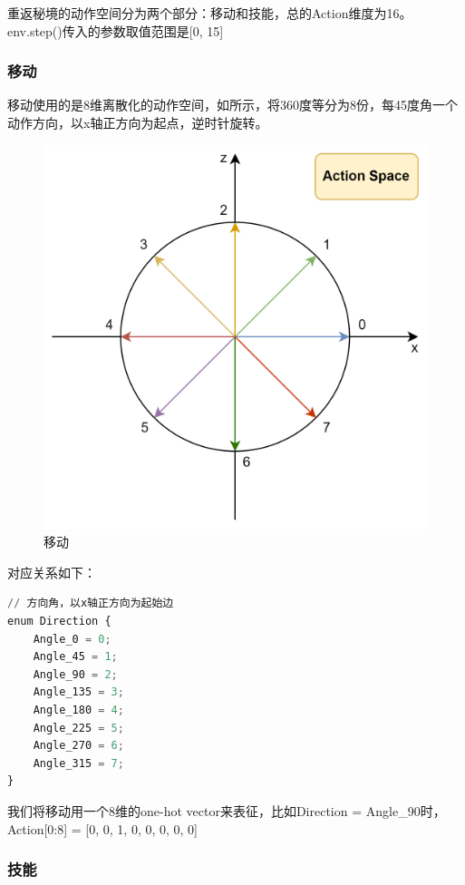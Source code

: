 重返秘境的动作空间分为两个部分：移动和技能，总的Action维度为16。env.step()传入的参数取值范围是[0, 15]


\subsubsection{移动}

移动使用的是8维离散化的动作空间，如所示，将360度等分为8份，每45度角一个动作方向，以x轴正方向为起点，逆时针旋转。

\begin{figure}[H]
    \centering
    \includegraphics[width=0.8\linewidth]{pic/action-space.png}
    \caption{ 移动}
    \label{action-space}
\end{figure}

对应关系如下：

\begin{lstlisting}[language=Python]
// 方向角，以x轴正方向为起始边
enum Direction {
    Angle_0 = 0;
    Angle_45 = 1;
    Angle_90 = 2;
    Angle_135 = 3;
    Angle_180 = 4;
    Angle_225 = 5;
    Angle_270 = 6;
    Angle_315 = 7;
}
\end{lstlisting}

我们将移动用一个8维的one-hot vector来表征，比如Direction = Angle\_90时，Action[0:8] = [0, 0, 1, 0, 0, 0, 0, 0]

\subsubsection{技能}

